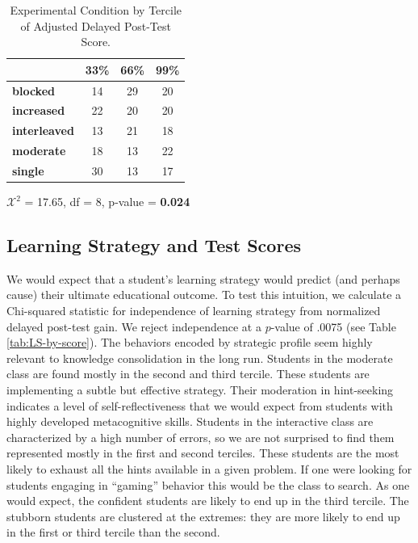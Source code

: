 \documentclass{edm_template}
\begin{document}
\begin{table}[hbtp]

\centering
\begin{tabular}{|l || c | c | c |}
\hline
&33\%&66\%&99\%\\ \hline \hline
  \textbf{blocked}  &   14& 29& 20 \\ \hline
  \textbf{increased}&   22& 20& 20 \\ \hline
\textbf{interleaved}& 13& 21& 18 \\ \hline
  \textbf{moderate} &   18& 13& 22 \\ \hline
    \textbf{single} &      30& 13& 17 \\ \hline
 \end{tabular}
  \begin{center} $\mathcal{X}^2$ = 17.65, df = 8, p-value = {\bf 0.024} \end{center}
 \caption{Experimental Condition by Tercile of Adjusted Delayed Post-Test Score.}
\label{tab:exp-and-score}
\end{table}


\subsection{Learning Strategy and Test Scores}

We would expect that a student's learning strategy would predict (and perhaps cause) their ultimate educational outcome. To test this intuition, we calculate a Chi-squared statistic for independence of learning strategy from normalized delayed post-test gain. We reject independence at a $p$-value of .0075 (see Table \ref{tab:LS-by-score}). The behaviors encoded by strategic profile seem highly relevant to knowledge consolidation in the long run. Students in the moderate class are found mostly in the second and third tercile. These students are implementing a subtle but effective strategy. Their moderation in hint-seeking indicates a level of self-reflectiveness that we would expect from students with highly developed metacognitive skills. Students in the interactive class are characterized by a high number of errors, so we are not surprised to find them represented mostly in the first and second terciles. These students are the most likely to exhaust all the hints available in a given problem. If one were looking for students engaging in ``gaming'' behavior this would be the class to search. As one would expect, the confident  students are likely to end up in the third tercile. The stubborn students are clustered at the extremes: they are more likely to end up in the first or third tercile than the second. 
\end{document}
